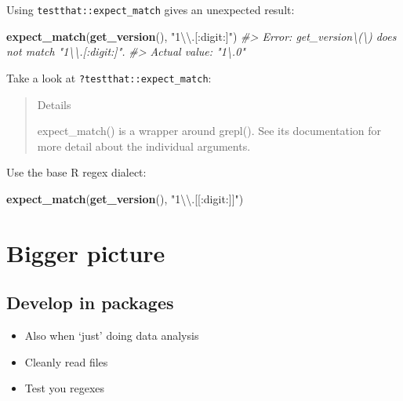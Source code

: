 \documentclass[]{book}
\newenvironment{Shaded}{}{}
\newcommand{\CharTok}[1]{\textcolor[rgb]{0.25,0.44,0.63}{#1}}
\newcommand{\CommentTok}[1]{\textcolor[rgb]{0.38,0.63,0.69}{\textit{#1}}}
\newcommand{\KeywordTok}[1]{\textcolor[rgb]{0.00,0.44,0.13}{\textbf{#1}}}
\newcommand{\NormalTok}[1]{#1}
\newcommand{\StringTok}[1]{\textcolor[rgb]{0.25,0.44,0.63}{#1}}
\providecommand{\tightlist}{%
  \setlength{\itemsep}{0pt}\setlength{\parskip}{0pt}}
\begin{document}
Using \texttt{testthat::expect\_match} gives an unexpected result:

\begin{Shaded}
\begin{Highlighting}[]
\KeywordTok{expect_match}\NormalTok{(}\KeywordTok{get_version}\NormalTok{(), }\StringTok{"1}\CharTok{\textbackslash{}\textbackslash{}}\StringTok{.[:digit:]"}\NormalTok{)}
\CommentTok{#> Error: get_version\textbackslash{}(\textbackslash{}) does not match "1\textbackslash{}\textbackslash{}.[:digit:]".}
\CommentTok{#> Actual value: "1\textbackslash{}.0"}
\end{Highlighting}
\end{Shaded}

Take a look at \texttt{?testthat::expect\_match}:

\begin{quote}
Details

expect\_match() is a wrapper around grepl().
See its documentation for more detail about the individual arguments.
\end{quote}

Use the base R regex dialect:

\begin{Shaded}
\begin{Highlighting}[]
\KeywordTok{expect_match}\NormalTok{(}\KeywordTok{get_version}\NormalTok{(), }\StringTok{"1}\CharTok{\textbackslash{}\textbackslash{}}\StringTok{.[[:digit:]]"}\NormalTok{)}
\end{Highlighting}
\end{Shaded}

\hypertarget{bigger-picture}{%
\section{Bigger picture}\label{bigger-picture}}

\hypertarget{develop-in-packages}{%
\subsection{Develop in packages}\label{develop-in-packages}}

\begin{itemize}
\tightlist
\item
  Also when `just' doing data analysis
\item
  Cleanly read files
\item
  Test you regexes
\end{itemize}
\end{document}
